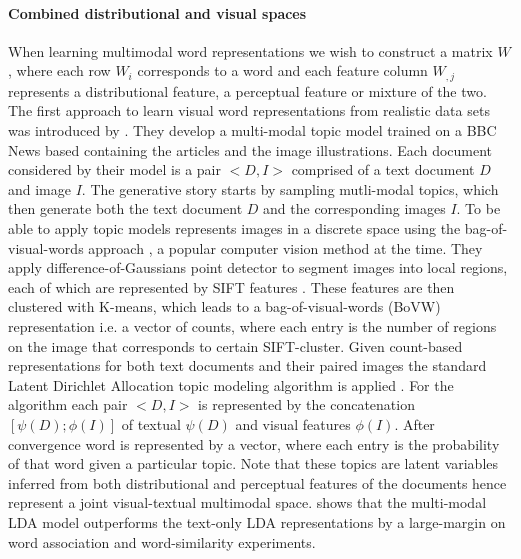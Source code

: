 \paragraph{Combined distributional and visual spaces}
When learning multimodal word representations we wish to construct a matrix $W$, where each row $W_i$
corresponds to a word and each feature column $W_{,j}$ represents a distributional feature,
a perceptual feature or mixture of the two.
The first approach to learn visual word representations from realistic data sets
was introduced by \cite{feng2010visual}. They develop a multi-modal topic model trained on a
BBC News based containing the articles and the image illustrations. Each document considered by their model
is a pair $<D, I>$ comprised of a text document $D$ and image $I$.
The generative story starts by sampling mutli-modal topics,
which then generate both the text document $D$ and the corresponding images $I$.
To be able to apply topic models \cite{feng2010visual} represents images
in a discrete space using the bag-of-visual-words approach \citep{csurka2004visual},
a popular computer vision method at the time.
They apply difference-of-Gaussians point detector to segment images
into local regions, each of which are represented by SIFT features \citep{lowe1999object}.
These features are then clustered with K-means, which leads to a
bag-of-visual-words (BoVW) representation i.e.
a vector of counts, where each entry is the number of regions on the image that
corresponds to certain SIFT-cluster. Given count-based representations for both
text documents and their paired images the standard
Latent Dirichlet Allocation topic modeling algorithm is applied \citep{blei2003latent}.
For the algorithm each pair $<D, I>$ is represented by the concatenation
$[\psi(D);\phi(I)]$ of textual $\psi(D)$ and visual features $\phi(I)$.
After convergence word is represented by a vector,
where each entry is the probability of that word given a particular topic.
Note that these topics are latent variables inferred from
both distributional and perceptual features of the documents hence represent a joint
visual-textual multimodal space. \cite{feng2010visual}
shows that the multi-modal LDA model outperforms the text-only LDA representations by a
large-margin on word association and word-similarity experiments.

